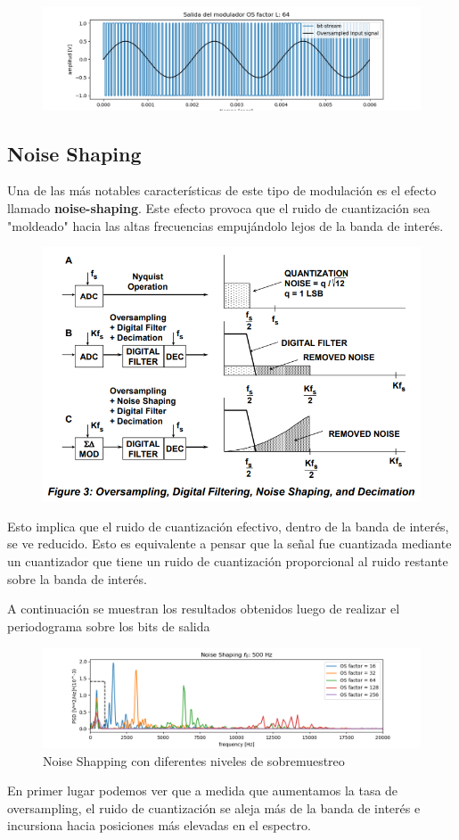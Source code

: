 \begin{figure}[H]
	\centering
	\includegraphics[width=0.7\linewidth]{ImagenesEjercicio2/BitsStream64}
	\caption{}
	\label{fig:bitsstream64}
\end{figure}


\subsection{Noise Shaping}
Una de las más notables características de este tipo de modulación es el efecto llamado \textbf{noise-shaping}. Este efecto provoca que el ruido de cuantización sea "moldeado" hacia las altas frecuencias empujándolo lejos de la banda de interés.


\begin{figure}[H]
	\centering
	\includegraphics[width=0.7\linewidth]{ImagenesEjercicio2/NoiseShappingAN}
	\caption{}
	\label{fig:noiseshappingan}
\end{figure}


Esto implica que el ruido de cuantización efectivo, dentro de la banda de interés, se ve reducido. Esto es equivalente a pensar que la señal fue cuantizada mediante un cuantizador que tiene un ruido de cuantización proporcional al ruido restante sobre la banda de interés.

A continuación se muestran los resultados obtenidos luego de realizar el periodograma sobre los bits de salida

\begin{figure}[H]
	\centering
	\includegraphics[width=\linewidth]{ImagenesEjercicio2/NoiseShappingDemo1zoom2solid.png}
	\caption{Noise Shapping con diferentes niveles de sobremuestreo}
	\label{fig:noiseshappingdemo1}
\end{figure}
En primer lugar podemos ver que a medida que aumentamos la tasa de oversampling, el ruido de cuantización se aleja más de la banda de interés e incursiona hacia posiciones más elevadas en el espectro.

